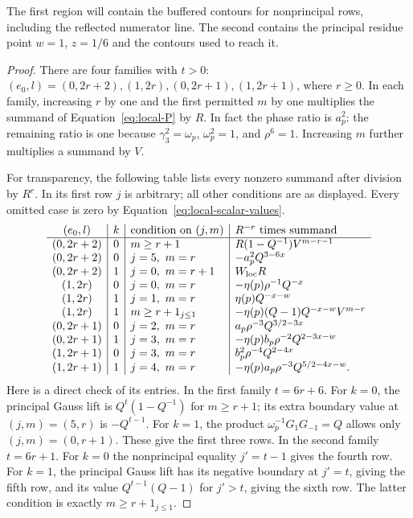 \documentclass[12pt]{article}
\begin{document}
The first region will contain the buffered contours for nonprincipal
rows, including the reflected numerator line. The second contains the
principal residue point $w=1$, $z=1/6$ and the contours used to reach it.

\begin{proof}
There are four families with $t>0$:
$(e_0,l)=(0,2r+2),(1,2r),(0,2r+1),(1,2r+1)$, where $r\ge0$.
In each family, increasing $r$ by one and the first permitted $m$
by one multiplies the summand of Equation~\eqref{eq:local-P} by
$R$.  In fact the phase ratio is $a_p^2$: the remaining ratio is
one because $\gamma_3^2=\omega_p$, $\omega_p^2=1$, and $\rho^6=1$.
Increasing $m$ further multiplies a summand by $V$.

For transparency, the following table lists every nonzero summand
after division by $R^r$.  In its first row $j$ is arbitrary; all
other conditions are as displayed.  Every omitted case is zero by
Equation~\eqref{eq:local-scalar-values}.
\begin{equation}\label{eq:local-family-table}
\begin{array}{c|c|l|l}
 (e_0,l)&k&\text{condition on }(j,m)&R^{-r}\text{ times summand}\\\hline
 (0,2r+2)&0&m\ge r+1&R(1-Q^{-1})V^{m-r-1}\\
 (0,2r+2)&0&j=5,\ m=r&-a_p^2Q^{3-6x}\\
 (0,2r+2)&1&j=0,\ m=r+1&W_{\rm loc}R\\
 (1,2r)&0&j=0,\ m=r&-\eta(p)\rho^{-1}Q^{-x}\\
 (1,2r)&1&j=1,\ m=r&\eta(p)Q^{-x-w}\\
 (1,2r)&1&m\ge r+1_{j\le1}&-\eta(p)(Q-1)Q^{-x-w}V^{m-r}\\
 (0,2r+1)&0&j=2,\ m=r&a_p\rho^{-3}Q^{3/2-3x}\\
 (0,2r+1)&1&j=3,\ m=r&-\eta(p)b_p\rho^{-2}Q^{2-3x-w}\\
 (1,2r+1)&0&j=3,\ m=r&b_p^2\rho^{-4}Q^{2-4x}\\
 (1,2r+1)&1&j=4,\ m=r&-\eta(p)a_p\rho^{-3}Q^{5/2-4x-w}.
\end{array}
\end{equation}
Here is a direct check of its entries.  In the first family $t=6r+6$.
For $k=0$, the principal Gauss lift is
$Q^t(1-Q^{-1})$ for $m\ge r+1$; its extra boundary value at
$(j,m)=(5,r)$ is $-Q^{t-1}$.  For $k=1$, the product
$\omega_p^{-1}G_1G_{-1}=Q$ allows only $(j,m)=(0,r+1)$.
These give the first three rows.  In the second family $t=6r+1$.
For $k=0$ the nonprincipal equality $j'=t-1$ gives the fourth row.
For $k=1$, the principal Gauss lift has its negative boundary at
$j'=t$, giving the fifth row, and its value $Q^{t-1}(Q-1)$ for
$j'>t$, giving the sixth row.  The latter condition is exactly
$m\ge r+1_{j\le1}$.


\end{proof}
\end{document}
